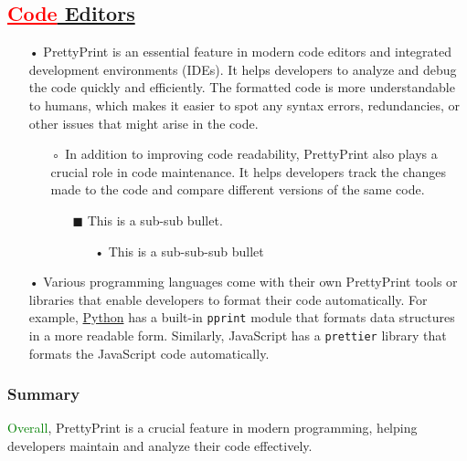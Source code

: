 \documentclass[12pt, a4paper]{article}
\begin{document}
\subsection{\textcolor{red}{\underline{Code}}\underline{ Editors}}
\begin{itemize}
\item[•] PrettyPrint is an essential feature in modern code editors and integrated development environments (IDEs). 
 It helps developers to analyze and debug the code quickly and efficiently. 
 The formatted code is more understandable to humans, which makes it easier to spot any syntax errors, redundancies, or other issues that might arise in the code.
\begin{itemize}
\item[◦] In addition to improving code readability, PrettyPrint also plays a crucial role in code maintenance. 
 It helps developers track the changes made to the code and compare different versions of the same code.
\begin{itemize}
\item[$\blacksquare$] This is a sub-sub bullet.
\begin{itemize}
\item[•] This is a sub-sub-sub bullet
\end{itemize}
\end{itemize}
\end{itemize}
\item[•] Various programming languages come with their own PrettyPrint tools or libraries that enable developers to format their code automatically. 
 For example, \href{http://python.org/}{Python} has a built-in \texttt{pprint} module that formats data structures in a more readable form. 
 Similarly, JavaScript has a \texttt{prettier} library that formats the JavaScript code automatically.
\end{itemize}
\subsubsection{Summary}
\textcolor{green}{Overall}, PrettyPrint is a crucial feature in modern programming, helping developers maintain and analyze their code effectively.
\end{document}
